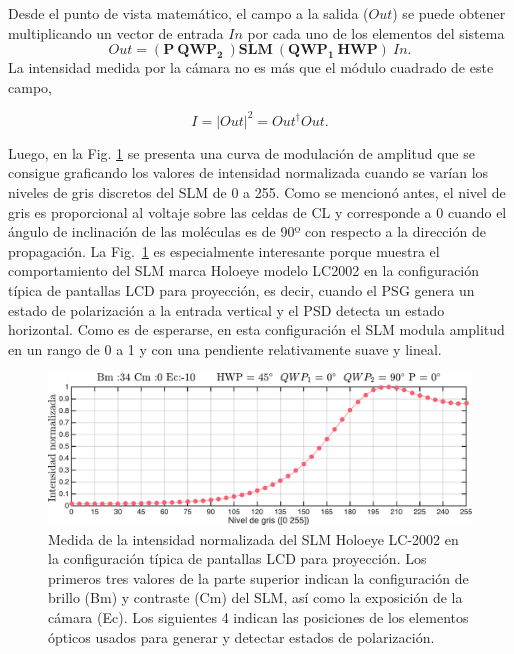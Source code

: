 Desde el punto de vista matemático, el campo a la salida ($Out$) se puede
obtener multiplicando un vector de entrada $In$ por cada uno de
los elementos del sistema 
\begin{equation}
\label{eq:ChGV_Out}
Out = \left( \mathbf{P}\ \mathbf{QWP_2}\ \right) \mathbf{SLM}\ \left( \mathbf{QWP_1}\
\mathbf{HWP}\right)\ In.
\end{equation}
La intensidad medida por la cámara no es más que el módulo cuadrado de
este campo,

\begin{equation}
I = |Out|^2 = Out^{\dagger}Out.
\end{equation}

Luego, en la Fig. \ref{fig:amp_H_V_SLM_2002} se presenta
una curva de modulación de amplitud que se consigue graficando los
valores de intensidad normalizada cuando se varían los niveles de gris discretos
del SLM de 0 a 255. Como se mencionó antes, el nivel de gris es
proporcional al voltaje sobre las celdas de CL y corresponde a 0
cuando el ángulo de inclinación de las moléculas es de 90º con
respecto a la dirección de propagación. La
Fig.~\ref{fig:amp_H_V_SLM_2002} es especialmente interesante porque
muestra el comportamiento del SLM marca Holoeye modelo LC2002 en la
configuración típica de pantallas LCD para proyección, es decir, cuando
el PSG genera un estado de polarización a la entrada vertical y el
PSD detecta un estado horizontal. Como es de esperarse, en esta
configuración el SLM modula amplitud en un rango de 0 a 1 y con una
pendiente relativamente suave y lineal. 
\begin{figure}[h!]
\centering
\includegraphics[scale=.55]{amp_H_V_SLM_2002.pdf}
\caption[Curva de modulación de amplitud para un estado no
óptimo]{Medida de la intensidad normalizada del SLM Holoeye LC-2002 en la configuración típica
  de pantallas LCD para proyección. Los primeros tres valores de la parte superior indican la
configuración de brillo (Bm) y contraste (Cm) del SLM, así como la
exposición de la cámara (Ec). Los siguientes 4 indican las posiciones
de los elementos ópticos usados para generar y detectar
estados de polarización.}
\label{fig:amp_H_V_SLM_2002}
\end{figure}
